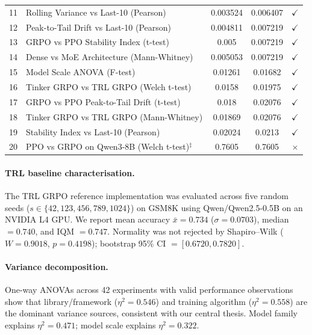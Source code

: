 \documentclass{article}
\begin{document}
\begin{table}[!ht]
\begin{tabular}{@{}rp{6.2cm}ccc@{}}
        11 & Rolling Variance vs Last-10 (Pearson) & 0.003524 & 0.006407 & $\checkmark$ \\
        12 & Peak-to-Tail Drift vs Last-10 (Pearson) & 0.004811 & 0.007219 & $\checkmark$ \\
        13 & GRPO vs PPO Stability Index (t-test) & 0.005 & 0.007219 & $\checkmark$ \\
        14 & Dense vs MoE Architecture (Mann-Whitney) & 0.005053 & 0.007219 & $\checkmark$ \\
        15 & Model Scale ANOVA (F-test) & 0.01261 & 0.01682 & $\checkmark$ \\
        16 & Tinker GRPO vs TRL GRPO (Welch t-test) & 0.0158 & 0.01975 & $\checkmark$ \\
        17 & GRPO vs PPO Peak-to-Tail Drift (t-test) & 0.018 & 0.02076 & $\checkmark$ \\
        18 & Tinker GRPO vs TRL GRPO (Mann-Whitney) & 0.01869 & 0.02076 & $\checkmark$ \\
        19 & Stability Index vs Last-10 (Pearson) & 0.02024 & 0.0213 & $\checkmark$ \\
        20 & PPO vs GRPO on Qwen3-8B (Welch t-test)$^{\ddag}$ & 0.7605 & 0.7605 & $\times$ \\
\bottomrule
\end{tabular}
\end{table}

\paragraph{TRL baseline characterisation.}
The TRL GRPO reference implementation was evaluated across five random seeds
($s \in \{42, 123, 456, 789, 1024\}$) on GSM8K using Qwen/Qwen2.5-0.5B on
an NVIDIA L4 GPU. We report mean accuracy $\bar{x} = 0.734$ ($\sigma = 0.0703$),
median $= 0.740$, and IQM $= 0.747$. Normality was not rejected by Shapiro--Wilk
($W = 0.9018$, $p = 0.4198$); bootstrap 95\% CI $= [0.6720, 0.7820]$.

\paragraph{Variance decomposition.}
One-way ANOVAs across 42 experiments with valid performance observations show
that library/framework ($\eta^2 = 0.546$) and training algorithm ($\eta^2 = 0.558$)
are the dominant variance sources, consistent with our central thesis. Model
family explains $\eta^2 = 0.471$; model scale explains $\eta^2 = 0.322$.
\end{document}

